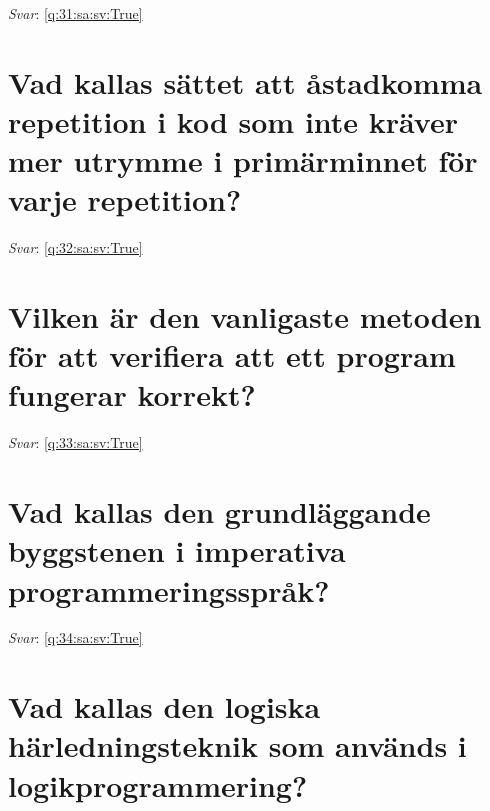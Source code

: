 \documentclass[a4paper,11pt,oneside]{book}
\begin{document}
\begin{sloppypar}
\textit{Svar}: \autoref{q:31:sa:sv:True}



\section{Vad kallas s\"attet att \r{a}stadkomma repetition i kod som inte kr\"aver mer utrymme i prim\"arminnet f\"or varje repetition?}

\label{q:32:sa:sv:False}

\vspace{2cm}

\noindent\makebox[\textwidth]{\hrulefill}

\vspace{1cm}

\textit{Svar}: \autoref{q:32:sa:sv:True}



\section{Vilken \"ar den vanligaste metoden f\"or att verifiera att ett program fungerar korrekt?}

\label{q:33:sa:sv:False}

\vspace{2cm}

\noindent\makebox[\textwidth]{\hrulefill}

\vspace{1cm}

\textit{Svar}: \autoref{q:33:sa:sv:True}



\section{Vad kallas den grundl\"aggande byggstenen i imperativa programmeringsspr\r{a}k?}

\label{q:34:sa:sv:False}

\vspace{2cm}

\noindent\makebox[\textwidth]{\hrulefill}

\vspace{1cm}

\textit{Svar}: \autoref{q:34:sa:sv:True}



\section{Vad kallas den logiska h\"arledningsteknik som anv\"ands i logikprogrammering?}


\end{sloppypar}
\end{document}
